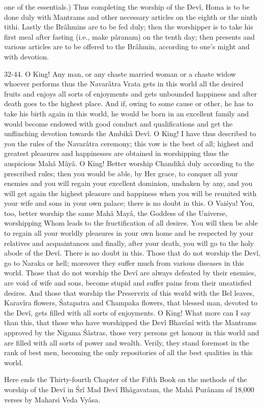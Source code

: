 one of the essentials.) Thus completing the worship of the Dev\^i, Homa is to be done duly with Mantrams and other necessary articles on the eighth or the ninth tithi. Lastly the Br\^ahmins are to be fed duly; then the worshipper is to take his first meal after fasting (i.e., make p\^aranam) on the tenth day; then presents and various articles are to be offered to the Br\^ahmin, according to one's might and with devotion.

32-44. O King! Any man, or any chaste married woman or a chaste widow whoever performs thus the Navar\^atra Vrata gets in this world all the desired fruits and enjoys all sorts of enjoyments and gets unbounded happiness and after death goes to the highest place. And if, owing to some cause or other, he has to take his birth again in this world, he would be born in an excellent family and would become endowed with good conduct and qualifications and get the unflinching devotion towards the Ambik\^a Dev\^i. O King! I have thus described to you the rules of the Navar\^atra ceremony; this vow is the best of all; highest and greatest pleasures and happinesses are obtained in worshipping thus the auspicious Mah\^a M\^ay\^a. O King! Better worship Chandik\^a duly according to the prescribed rules; then you would be able, by Her grace, to conquer all your enemies and you will regain your excellent dominion, unshaken by any, and you will get again the highest pleasure and happiness when you will be reunited with your wife and sons in your own palace; there is no doubt in this. O Vai\'sya! You, too, better worship the same Mah\^a May\^a, the Goddess of the Universe, worshipping Whom leads to the fructification of all desires. You will then be able to regain all your worldly pleasures in your own home and be respected by your relatives and acquaintances and finally, after your death, you will go to the holy abode of the Dev\^i. There is no doubt in this. Those that do not worship the Dev\^i, go to Naraka or hell; moreover they suffer much from various diseases in this world. Those that do not worship the Dev\^i are always defeated by their enemies, are void of wife and sons, become stupid and suffer pains from their unsatisfied desires. And those that worship the Preservrix of this world with the Bel leaves, Karav\^ira flowers, \'Satapatra and Champaka flowers, that blessed man, devoted to the Dev\^i, gets filled with all sorts of enjoyments. O King! What more can I say than this, that those who have worshipped the Dev\^i Bhav\^an\^i with the Mantrams approved by the Nigama \'S\^astras, those very persons get honour in this world and are filled with all sorts of power and wealth. Verily, they stand foremost in the rank of best men, becoming the only repositories of all the best qualities in this world.

Here ends the Thirty-fourth Chapter of the Fifth Book on the methods of the worship of the Dev\^i in \'Sr\^i Mad Dev\^i Bh\^agavatam, the Mah\^a Pur\^anam of 18,000 verses by Maharsi Veda Vy\^asa.